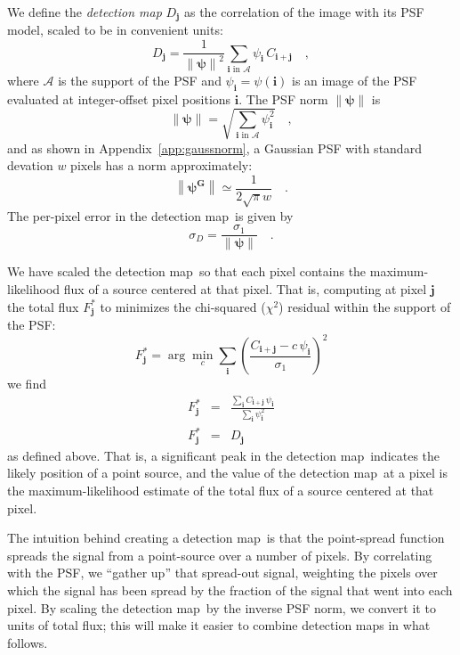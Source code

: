 \documentclass[letterpaper,preprint]{aastex}
\newcommand{\appref}[1]{\mbox{Appendix~\ref{#1}}}
\newcommand{\detmap}{detection map}
\newcommand{\psf}{\psi}
\newcommand{\psfat}[1]{\psf_{#1}}
\newcommand{\psfnorm}{\norm{\bm{\psf}}}
\newcommand{\norm}[1]{\left\lVert #1 \right\rVert}
\newcommand{\psfw}{w}
\renewcommand{\vec}[1]{\boldsymbol{#1}}
\newcommand{\ivec}{\vec{i}}
\newcommand{\jvec}{\vec{j}}
\newcommand{\iina}{\ivec \,\, \mathrm{in} \,\, \mathcal{A}}
\begin{document}
We define the \emph{\detmap} $D_{\jvec}$ as the correlation of
the image with its PSF model, scaled to be in convenient units:
\begin{equation}
D_{\jvec} = \frac{1}{\psfnorm^2} \sum_{\iina} \psfat{\ivec} \, C_{\ivec + \jvec} \quad ,
\label{eq:detmap}
\end{equation}
where $\mathcal{A}$ is the support of the PSF and
$\psfat{\ivec} = \psf(\ivec)$ is an image of the PSF evaluated at
integer-offset pixel positions $\ivec$.  The PSF norm $\psfnorm$ is
\begin{equation}
\psfnorm = \sqrt{\sum_{\iina} \psfat{\ivec}^2} \quad ,
\end{equation}
and as shown in \appref{app:gaussnorm}, a Gaussian PSF with standard
devation $\psfw$ pixels has a norm approximately:
\begin{equation}
  \norm{\bm{\psf^G}} \simeq \frac{1}{2 \sqrt{\pi} \psfw} \quad .
\end{equation}
The per-pixel error in the \detmap\ is given by
\begin{equation}
\sigma_{D} = \frac{\sigma_1}{\psfnorm} \quad .
\end{equation}


We have scaled the \detmap\ so that each pixel contains the
maximum-likelihood flux of a source centered at that pixel.
That is, computing at pixel $\jvec$ the total flux
$F^{\ast}_{\jvec}$ to minimizes the chi-squared ($\chi^2$) residual
within the support of the PSF:
\begin{equation}
  F^{\ast}_{\jvec} = \arg\min_{c} \sum_{\ivec} \left( \frac{C_{\ivec+\jvec} - c \, \psi_{\ivec}}{\sigma_1} \right)^2
\end{equation}
we find
\begin{eqnarray}
  F^{\ast}_{\jvec} &=& \frac{\sum_{\ivec} C_{\ivec+\jvec} \, \psi_{\ivec}}{\sum_{\ivec} \psi_{\ivec}^2}
  \\
  F^{\ast}_{\jvec} &=& D_{\jvec}
\end{eqnarray}
as defined above.
%
That is, a significant peak in the \detmap\ indicates the likely
position of a point source, and the value of the \detmap\ at a pixel
is the maximum-likelihood estimate of the total flux of a
source centered at that pixel.


The intuition behind creating a \detmap\ is that the point-spread
function spreads the signal from a point-source over a number of
pixels.  By correlating with the PSF, we ``gather up'' that spread-out
signal, weighting the pixels over which the signal has been spread by
the fraction of the signal that went into each pixel.  By scaling the
\detmap\ by the inverse PSF norm, we convert it to units of total flux;
this will make it easier to combine \detmap s in what follows.
\end{document}
